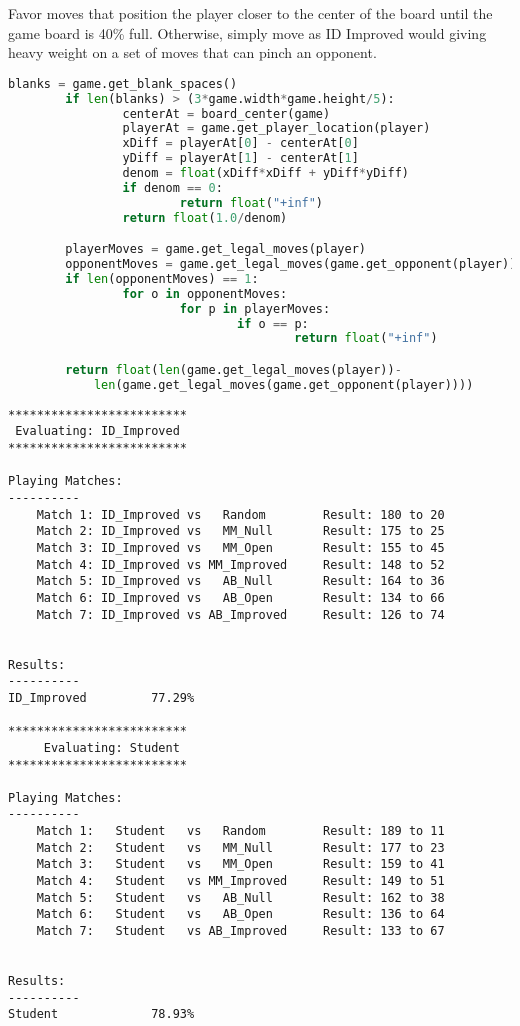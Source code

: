 \documentclass[10pt, a4paper]{article}
\begin{document}
Favor moves that position the player closer to the center of the board until the game board is 40\% full.
Otherwise, simply move as ID Improved would giving heavy weight on a set of moves that can pinch an opponent.

\begin{lstlisting}[language=Python]
		blanks = game.get_blank_spaces()
		if len(blanks) > (3*game.width*game.height/5):
				centerAt = board_center(game)
				playerAt = game.get_player_location(player)
				xDiff = playerAt[0] - centerAt[0]
				yDiff = playerAt[1] - centerAt[1]
				denom = float(xDiff*xDiff + yDiff*yDiff)
				if denom == 0:
						return float("+inf")
				return float(1.0/denom)

		playerMoves = game.get_legal_moves(player)
		opponentMoves = game.get_legal_moves(game.get_opponent(player))
		if len(opponentMoves) == 1:
				for o in opponentMoves:
						for p in playerMoves:
								if o == p:
										return float("+inf")

		return float(len(game.get_legal_moves(player))-
			len(game.get_legal_moves(game.get_opponent(player))))
\end{lstlisting}

\begin{verbatim}
*************************
 Evaluating: ID_Improved 
*************************

Playing Matches:
----------
	Match 1: ID_Improved vs   Random    	Result: 180 to 20
	Match 2: ID_Improved vs   MM_Null   	Result: 175 to 25
	Match 3: ID_Improved vs   MM_Open   	Result: 155 to 45
	Match 4: ID_Improved vs MM_Improved 	Result: 148 to 52
	Match 5: ID_Improved vs   AB_Null   	Result: 164 to 36
	Match 6: ID_Improved vs   AB_Open   	Result: 134 to 66
	Match 7: ID_Improved vs AB_Improved 	Result: 126 to 74


Results:
----------
ID_Improved         77.29%

*************************
	 Evaluating: Student   
*************************

Playing Matches:
----------
	Match 1:   Student   vs   Random    	Result: 189 to 11
	Match 2:   Student   vs   MM_Null   	Result: 177 to 23
	Match 3:   Student   vs   MM_Open   	Result: 159 to 41
	Match 4:   Student   vs MM_Improved 	Result: 149 to 51
	Match 5:   Student   vs   AB_Null   	Result: 162 to 38
	Match 6:   Student   vs   AB_Open   	Result: 136 to 64
	Match 7:   Student   vs AB_Improved 	Result: 133 to 67


Results:
----------
Student             78.93%
\end{verbatim}
\end{document}
